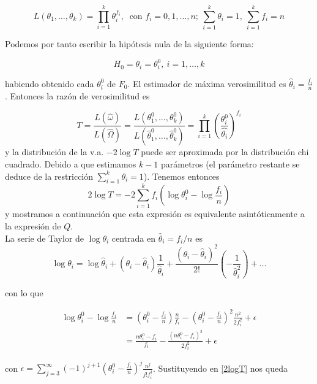 	\[ L(\theta_1, \dots, \theta_k) = 
			\prod\limits_{i=1}^k \theta_i^{f_i},\			
	   \text{ con } f_i = 0, 1, \dots, n; \
	   \sum\limits_{i=1}^k \theta_i = 1, \
	   \sum\limits_{i=1}^k f_i = n
	 \]
	 
	Podemos por tanto escribir la hipótesis nula de la 
siguiente forma:
	 
	\[ H_0 = \theta_i = \theta_i^0,\ i = 1, \dots, k \]
	 
	habiendo obtenido cada $\theta_i^0$ de $F_0$. El 
estimador de máxima verosimilitud es $\hat{\theta}_i = 
\frac{f_i}{n}$. Entonces la razón de verosimilitud es
	 
	 \[ 
	 T = \frac{L(\hat{\omega})}{L(\hat{\Omega})}
	   = \frac{L(\theta_1^0, \dots, \theta_k^0)}
	   		{L(\hat{\theta}_1^0, \dots, \hat{\theta}_k^0)}
	   = \prod\limits_{i=1}^k
	   		\left( 
	 			\frac{\theta_i^0}{\hat{\theta_i}} 
	 		\right)^{f_i}
	 \]
	 y la distribución de la v.a. $-2 \log T$ puede ser 
aproximada por la distribución chi cuadrado. Debido a que 
estimamos $k-1$ parámetros (el parámetro restante se deduce 
de la restricción $\sum\limits_{i=1}^k \theta_i = 1$). 
Tenemos entonces
	 \begin{equation}
	 2 \log T = 
	 		-2 \sum\limits_{i=1}^k
	 			f_i \left(
	 					\log \theta_i^0 - \log \frac{f_i}{n}
	 				\right)
	 \label{2logT}
	 \end{equation}
	y mostramos a continuación que esta expresión es 
equivalente asintóticamente a la expresión de $Q$.\\
	
	La serie de Taylor de $\log \theta_i$ centrada en 
$\hat{\theta}_i = f_i/n$ es
	\[ \log \theta_i = 
			\log \hat{\theta}_i +
			(\theta_i - \hat{\theta}_i)
				\frac{1}{\hat{\theta}_i} +
			\frac{(\theta_i - \hat{\theta}_i)^2}{2!}
				\left(-\frac{1}{\hat{\theta}_i^2}\right) +
			\dots
	\]
	
	con lo que
	
	\begin{align*}	
	 \log \theta_i^0 - \log \frac{f_i}{n} & = 
			\left(
				\theta_i^0 - \frac{f_i}{n}
			\right) \frac{n}{f_i} -
			\left(
				\theta_i^0 - \frac{f_i}{n}
			\right)^2 \frac{n^2}{2f_i^2} + \epsilon \\
		&= \frac{n\theta_i^0 - f_i}{f_i} -
			\frac{(n\theta_i^0 - f_i)^2}{2f_i^2} +\epsilon
	\end{align*}
	
	con $\epsilon = \sum\limits_{j=3}^\infty
			(-1)^{j+1} 
			\left( \theta_i^0 - \frac{f_i}{n}\right)^j
			\frac{n^j}{j!f_i^j}$. Sustituyendo en \ref{2logT} 
nos queda
			
